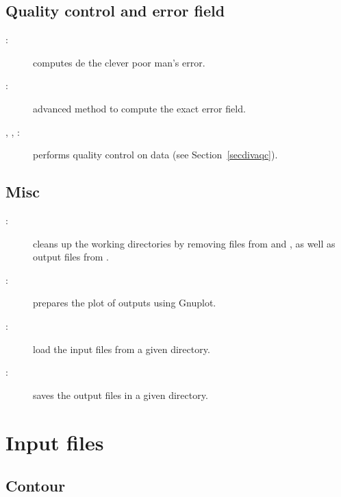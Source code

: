\subsection{Quality control and error field}

\begin{description}
\item[:] computes de the clever poor man's error.
\item[:] advanced method to compute the exact error field.
\item[, , :] performs quality control on data (see Section~\ref{secdivaqc}).
\end{description}

\subsection{Misc}

\begin{description}
\item[:] cleans up the working directories by removing  files from  and , as well as output files from .
\item[:] prepares the plot of outputs using Gnuplot.
\item[:] load the input files from a given directory.
\item[:] saves the output files in a given directory.
\end{description}

\section{Input files\label{sec:diva2Dinput}}

\subsection{Contour\label{contourdiva}}

